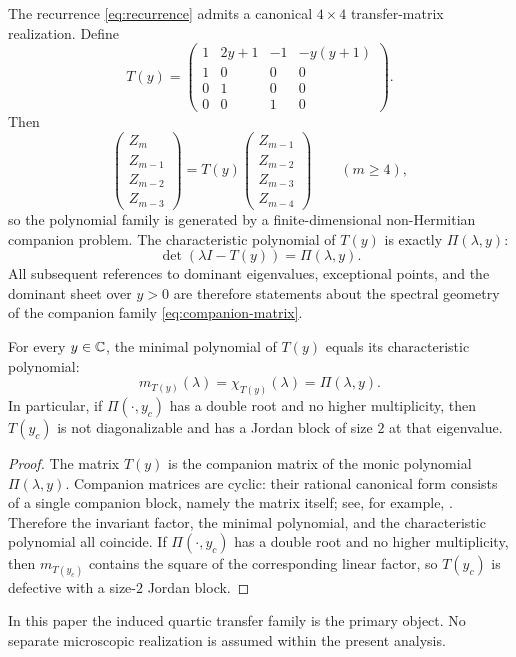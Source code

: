 The recurrence \eqref{eq:recurrence} admits a canonical $4\times 4$ transfer-matrix realization.
Define
\begin{equation}\label{eq:companion-matrix}
T(y)=
\begin{pmatrix}
1 & 2y+1 & -1 & -y(y+1)\\
1 & 0 & 0 & 0\\
0 & 1 & 0 & 0\\
0 & 0 & 1 & 0
\end{pmatrix}.
\end{equation}
Then
\[
\begin{pmatrix}
Z_m\\ Z_{m-1}\\ Z_{m-2}\\ Z_{m-3}
\end{pmatrix}
=
T(y)
\begin{pmatrix}
Z_{m-1}\\ Z_{m-2}\\ Z_{m-3}\\ Z_{m-4}
\end{pmatrix}
\qquad (m\ge 4),
\]
so the polynomial family is generated by a finite-dimensional non-Hermitian companion problem.
The characteristic polynomial of \(T(y)\) is exactly \(\Pi(\lambda,y)\):
\[
\det(\lambda I-T(y))=\Pi(\lambda,y).
\]
All subsequent references to dominant eigenvalues, exceptional points, and the dominant sheet over $y>0$ are therefore statements about the spectral geometry of the companion family \eqref{eq:companion-matrix}.

\begin{lemma}\label{lem:cyclic-companion}
For every \(y\in\mathbb{C}\), the minimal polynomial of \(T(y)\) equals its characteristic polynomial:
\[
m_{T(y)}(\lambda)=\chi_{T(y)}(\lambda)=\Pi(\lambda,y).
\]
In particular, if \(\Pi(\cdot,y_c)\) has a double root and no higher multiplicity, then \(T(y_c)\) is not diagonalizable and has a Jordan block of size \(2\) at that eigenvalue.
\end{lemma}

\begin{proof}
The matrix \(T(y)\) is the companion matrix of the monic polynomial \(\Pi(\lambda,y)\).
Companion matrices are cyclic: their rational canonical form consists of a single companion block, namely the matrix itself; see, for example, \cite{HornJohnson2012}.
Therefore the invariant factor, the minimal polynomial, and the characteristic polynomial all coincide.
If \(\Pi(\cdot,y_c)\) has a double root and no higher multiplicity, then \(m_{T(y_c)}\) contains the square of the corresponding linear factor, so \(T(y_c)\) is defective with a size-\(2\) Jordan block.
\end{proof}

In this paper the induced quartic transfer family is the primary object.
No separate microscopic realization is assumed within the present analysis.

